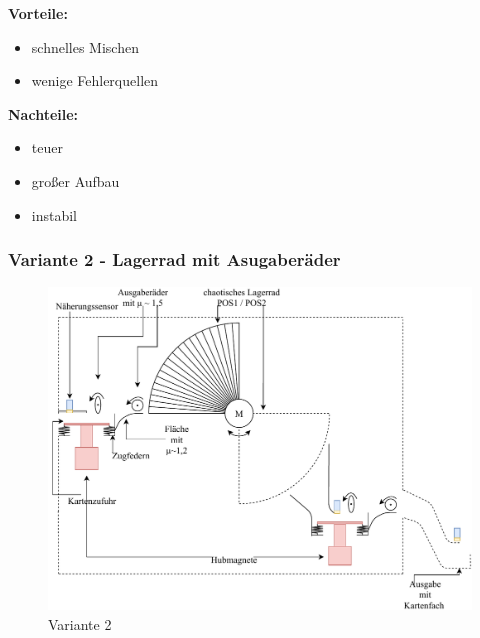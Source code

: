 \textbf{Vorteile:}
\begin{itemize}
    \item schnelles Mischen
    \item wenige Fehlerquellen
\end{itemize}
\textbf{Nachteile:}
\begin{itemize}
    \item teuer
    \item großer Aufbau %
    \item instabil
\end{itemize}

\subsubsection{Variante 2 - Lagerrad mit Asugaberäder}

\begin{figure}[hb]
    \centering
    \includegraphics[scale=0.9,page=1]{fig/mech/Version2}
    \caption{Variante 2}
\end{figure}

